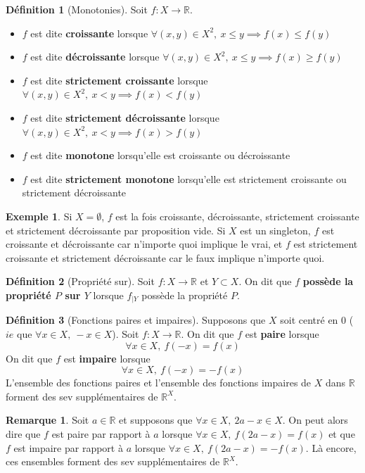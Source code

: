 \documentclass[french]{book}
\newcommand{\R}{\mathbb{R}}
\theoremstyle{plain}
\theoremstyle{definition}
\newtheorem{dfn}{Définition}[chapter]
\newtheorem{exa}{Exemple}[chapter]
\newtheorem{rmq}{Remarque}[chapter]
\theoremstyle{remark}
\begin{document}
\begin{dfn}[Monotonies]
	Soit $f:X\rightarrow\R$.
	\begin{itemize}
		\item $f$ est dite \textbf{croissante} lorsque $\forall(x,y)\in X^2,\ x\leqslant y\implies f(x)\leqslant f(y)$
		\item $f$ est dite \textbf{décroissante} lorsque $\forall(x,y)\in X^2,\ x\leqslant y\implies f(x)\geqslant f(y)$
		\item $f$ est dite \textbf{strictement croissante} lorsque $\forall(x,y)\in X^2,\ x< y\implies f(x)< f(y)$
		\item $f$ est dite \textbf{strictement décroissante} lorsque $\forall(x,y)\in X^2,\ x< y\implies f(x)> f(y)$
		\item $f$ est dite \textbf{monotone} lorsqu'elle est croissante ou décroissante
		\item $f$ est dite \textbf{strictement monotone} lorsqu'elle est strictement croissante ou strictement décroissante
	\end{itemize}
\end{dfn}
\begin{exa}
	Si $X=\emptyset$, $f$ est la fois croissante, décroissante, strictement croissante et strictement décroissante par proposition vide. Si $X$ est un singleton, $f$ est croissante et décroissante car n'importe quoi implique le vrai, et $f$ est strictement croissante et strictement décroissante car le faux implique n'importe quoi.
\end{exa}
\begin{dfn}[Propriété sur]
	Soit $f:X\rightarrow\R$ et $Y\subset X$. On dit que $f$ \textbf{possède la propriété $P$ sur $Y$} lorsque $f_{|Y}$ possède la propriété $P$.
\end{dfn}
\begin{dfn}[Fonctions paires et impaires]
	Supposons que $X$ soit centré en $0$ ($ie$ que $\forall x\in X,\ -x\in X$). Soit $f:X\rightarrow\R$. On dit que $f$ est \textbf{paire} lorsque $$\forall x\in X,\ f(-x)=f(x)$$ On dit que $f$ est \textbf{impaire} lorsque $$\forall x\in X,\ f(-x)=-f(x)$$ L'ensemble des fonctions paires et l'ensemble des fonctions impaires de $X$ dans $\R$ forment des sev supplémentaires de $\R^X$.
\end{dfn}
\begin{rmq}
	Soit $a\in\R$ et supposons que $\forall x\in X,\ 2a-x\in X$. On peut alors dire que $f$ est paire par rapport à $a$ lorsque $\forall x\in X,\ f(2a-x)=f(x)$ et que $f$ est impaire par rapport à $a$ lorsque $\forall x\in X,\ f(2a-x)=-f(x)$. Là encore, ces ensembles forment des sev supplémentaires de $\R^X$.
\end{rmq}
\end{document}
